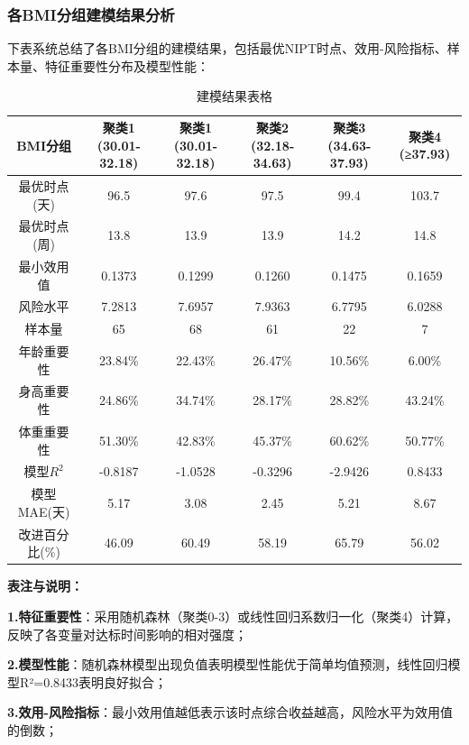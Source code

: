 \documentclass{article}
\begin{document}
\subsubsection{\textbf{各BMI分组建模结果分析}}
下表系统总结了各BMI分组的建模结果，包括最优NIPT时点、效用-风险指标、样本量、特征重要性分布及模型性能：
\begin{table}[htbp]
    \centering
    \small
    \begin{tabular*}{\linewidth}{@{\extracolsep{\fill}}c c c c c c}
        \toprule  %
        BMI分组    & 聚类1 (30.01-32.18)    & 聚类1 (30.01-32.18) &  聚类2 (32.18-34.63) & 聚类3 (34.63-37.93) & 聚类4 (≥37.93) \\
        \midrule  %
        最优时点(天)     & 96.5 &97.6&97.5&99.4&103.7     \\
        最优时点(周)      & 13.8  & 13.9&13.9&14.2&14.8     \\
        最小效用值      & 0.1373 & 0.1299 & 0.1260 &0.1475&0.1659     \\
        风险水平     & 7.2813 & 7.6957&7.9363 & 6.7795 &6.0288     \\
        样本量      & 65    & 68 &61& 22 & 7     \\
        年龄重要性 & 23.84\% & 22.43\% &26.47\%&10.56\%&6.00\% \\
        身高重要性     & 24.86\%&34.74\%&28.17\%&28.82\%&43.24\%          \\
        体重重要性      & 51.30\%  & 42.83\% &45.37\%&60.62\%&50.77\%     \\
        模型$R^2$      & -0.8187 & -1.0528 & -0.3296 & -2.9426     & 0.8433     \\
        模型MAE(天)      & 5.17 & 3.08 & 2.45 & 5.21 & 8.67     \\
        改进百分比(\%)      & 46.09 & 60.49 & 58.19 & 65.79 & 56.02      \\
        \bottomrule  %
    \end{tabular*}
    \caption{建模结果表格}
    \label{tab:crops_booktabs}
\end{table}
\textbf{表注与说明：}

\textbf{1.特征重要性}：采用随机森林（聚类0-3）或线性回归系数归一化（聚类4）计算，反映了各变量对达标时间影响的相对强度；

\textbf{2.模型性能}：随机森林模型出现负值表明模型性能优于简单均值预测，线性回归模型R²=0.8433表明良好拟合；

\textbf{3.效用-风险指标}：最小效用值越低表示该时点综合收益越高，风险水平为效用值的倒数；
\end{document}
